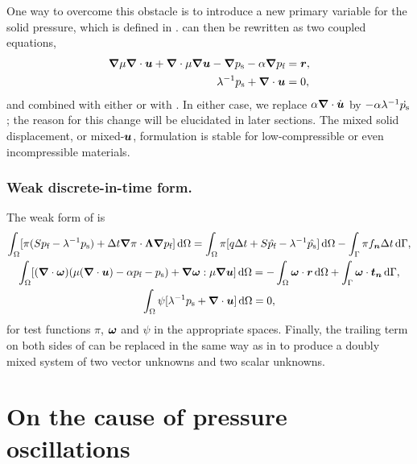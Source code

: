 One way to overcome this obstacle is to introduce a new primary variable for
the solid pressure, which is defined in .
 can then be rewritten as two coupled equations,
\begin{align}
\label{eq:mixu1}
\nabla \mu \nabla \cdot \U + \nabla \cdot \mu \nabla \U
 - \nabla \Ps - \alpha \nabla \Pf &= \V{r},\\
\label{eq:mixu2}
\lambda^{-1}\Ps+\nabla\cdot\U &= 0,
\end{align}
and combined with either  or with .
In either case, we replace $\alpha \nabla \cdot \dot{\U}$ by $- \alpha
\lambda^{-1} \dot{p_{\text{s}}}$; the reason for this change will be elucidated in later
sections.
The mixed solid displacement, or mixed-$\boldsymbol{u}$, formulation is stable for
low-compressible or even incompressible materials.

\subsubsection*{Weak discrete-in-time form.}

The weak form of  is
\begin{gather}
  \label{eq:weakpressmix2}
  \int_\Omega [\pi(
  S \Pf
  - \lambda^{-1} \Ps)
  + \Delta t \nabla\pi \cdot \Lambda \nabla \Pf
  ] \D\Omega 
  = \int_\Omega \pi[
   q \Delta t
  + S \prev{\Pf}
  - \lambda^{-1} \prev{\Ps}] \D\Omega
-\int_\Gamma \pi f_{\V{n}}\Delta t \D\Gamma,\\
%
\label{eq:weakdisplmix}
  \int_\Omega [
  (\nabla\cdot\V{\omega})(\mu(\nabla\cdot\U)
  -\alpha \Pf - \Ps)
  +\nabla \V{\omega} : \mu  \nabla \U
  ]  \D\Omega = - \int_\Omega \V{\omega} \cdot \V{r} \D\Omega + \int_\Gamma \V{\omega}
  \cdot \V{t}_{\V{n}} \D\Gamma,\\
%
\label{eq:weaks}
  \int_\Omega \psi[
     \lambda^{-1}\Ps + \nabla \cdot \U 
  ]  \D\Omega
  = 0,
\end{gather}
for test functions $\pi$, $\boldsymbol{\omega}$ and $\psi$ in the appropriate spaces.
Finally, the trailing term on both sides of  can be replaced in the
same way as in  to produce a doubly mixed
system of two vector unknowns and two scalar unknowns.

\section{On the cause of pressure oscillations}

